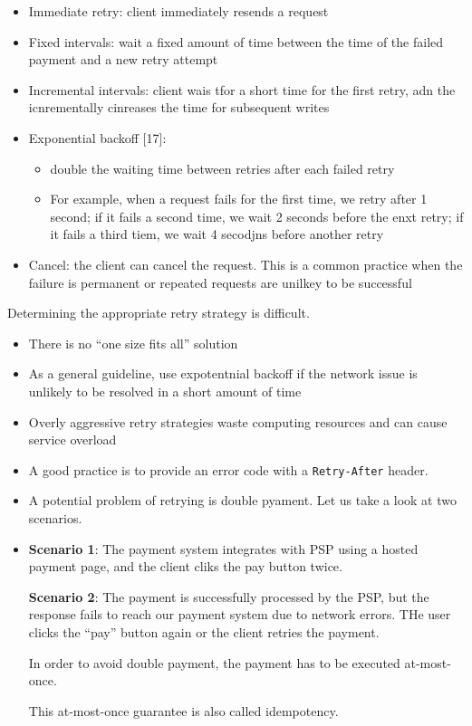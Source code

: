 \documentclass{report}
\theoremstyle{definition}
\begin{document}
\begin{itemize}
\item
Immediate retry: client immediately resends a request
\item
Fixed intervals: wait a fixed amount of time between the time of the failed payment and a new retry attempt
\item
Incremental intervals: client wais tfor a short time for the first retry, adn the icnrementally cinreases the time for subsequent writes
\item
Exponential backoff [17]:

\begin{itemize}
\item
double the waiting time between retries after each failed retry
\item
For example, when a request fails for the first time, we retry after 1 second; if it fails a second time, we wait 2 seconds before the enxt retry; if it fails a third tiem, we wait 4 secodjns before another retry
\end{itemize}
\item
Cancel: the client can cancel the request. This is a common practice when the failure is permanent or repeated requests are unilkey to be successful
\end{itemize}

Determining the appropriate retry strategy is difficult.

\begin{itemize}
\item
There is no ``one size fits all'' solution
\item
As a general guideline, use expotentnial backoff if the network issue is unlikely to be resolved in a short amount of time
\item
Overly aggressive retry strategies waste computing resources and can cause service overload
\item
A good practice is to provide an error code with a \lstinline|Retry-After| header.
\item
A potential problem of retrying is double pyament. Let us take a look at two scenarios.
\end{itemize}

\begin{itemize}
\item
\textbf{Scenario 1}: The payment system integrates with PSP using a hosted payment page, and the client cliks the pay button twice.

\textbf{Scenario 2}: The payment is successfully processed by the PSP, but the response fails to reach our payment system due to network errors. THe user clicks the ``pay'' button again or the client retries the payment.

In order to avoid double payment, the payment has to be executed at-most-once.

This at-most-once guarantee is also called idempotency.
\end{itemize}
\end{document}
